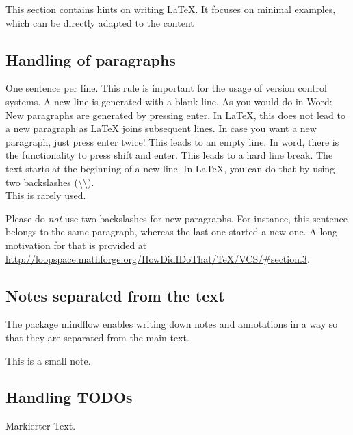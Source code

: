 \documentclass[sigconf,balance]{acmart}
\newcommand{\textmarker}[1]{{\color{red} #1}\xspace}
\begin{document}
This section contains hints on writing LaTeX.
It focuses on minimal examples, which can be directly adapted to the content

\subsection{Handling of paragraphs}

\begin{ltgexample}
One sentence per line.
This rule is important for the usage of version control systems.
A new line is generated with a blank line.
As you would do in Word:
New paragraphs are generated by pressing enter.
In LaTeX, this does not lead to a new paragraph as LaTeX joins subsequent lines.
In case you want a new paragraph, just press enter twice!
This leads to an empty line.
In word, there is the functionality to press shift and enter.
This leads to a hard line break.
The text starts at the beginning of a new line.
In LaTeX, you can do that by using two backslashes (\textbackslash\textbackslash).
\\
This is rarely used.

Please do \textit{not} use two backslashes for new paragraphs.
For instance, this sentence belongs to the same paragraph, whereas the last one started a new one.
A long motivation for that is provided at \url{http://loopspace.mathforge.org/HowDidIDoThat/TeX/VCS/#section.3}.
\end{ltgexample}

\subsection{Notes separated from the text}

The package mindflow enables writing down notes and annotations in a way so that they are separated from the main text.

\begin{ltgexample}
\begin{mindflow}
This is a small note.
\end{mindflow}
\end{ltgexample}

\subsection{Handling TODOs}

\begin{ltgexample}
\textmarker{Markierter Text.}
\end{ltgexample}
\end{document}

